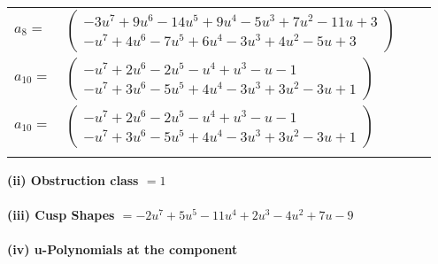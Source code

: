 \documentclass[1p]{elsarticle_modified}
\theoremstyle{definition}
\begin{document}
\begin{tabular}{m{7pt} m{180pt} m{7pt} m{180pt} }
\flushright $a_{8}=$&$\begin{pmatrix}-3 u^7+9 u^6-14 u^5+9 u^4-5 u^3+7 u^2-11 u+3\\- u^7+4 u^6-7 u^5+6 u^4-3 u^3+4 u^2-5 u+3\end{pmatrix}$ \\
\flushright $a_{10}=$&$\begin{pmatrix}- u^7+2 u^6-2 u^5- u^4+u^3- u-1\\- u^7+3 u^6-5 u^5+4 u^4-3 u^3+3 u^2-3 u+1\end{pmatrix}$\\ \flushright $a_{10}=$&$\begin{pmatrix}- u^7+2 u^6-2 u^5- u^4+u^3- u-1\\- u^7+3 u^6-5 u^5+4 u^4-3 u^3+3 u^2-3 u+1\end{pmatrix}$\\&\end{tabular}
\flushleft \textbf{(ii) Obstruction class $= 1$}\\~\\
\flushleft \textbf{(iii) Cusp Shapes $= -2 u^7+5 u^5-11 u^4+2 u^3-4 u^2+7 u-9$}\\~\\
\newpage\renewcommand{\arraystretch}{1}
\flushleft \textbf{(iv) u-Polynomials at the component}\newline \\
\end{document}
